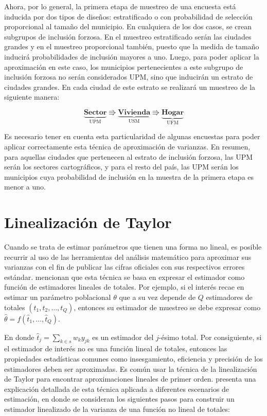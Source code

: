 \documentclass[
  12pt,
  spanish,
]{book}
\begin{document}
Ahora, por lo general, la primera etapa de muestreo de una encuesta está inducida por dos tipos de diseños: estratificado o con probabilidad de selección proporcional al tamaño del municipio. En cualquiera de los dos casos, se crean subgrupos de inclusión forzosa. En el muestreo estratificado serán las ciudades grandes y en el muestreo proporcional también, puesto que la medida de tamaño inducirá probabilidades de inclusión mayores a uno. Luego, para poder aplicar la aproximación en este caso, los municipios pertenecientes a este subgrupo de inclusión forzosa no serán considerados UPM, sino que inducirán un estrato de ciudades grandes. En cada ciudad de este estrato se realizará un muestreo de la siguiente manera:

\begin{equation*}
\underbrace{\textbf{Sector}}_{\text{UPM}} \Rrightarrow
\underbrace{\textbf{Vivienda}}_{\text{USM}} \Rrightarrow
\underbrace{\textbf{Hogar}}_{\text{UFM}}
\end{equation*}

Es necesario tener en cuenta esta particularidad de algunas encuestas para poder aplicar correctamente esta técnica de aproximación de varianzas. En resumen, para aquellas ciudades que pertenecen al estrato de inclusión forzosa, las UPM serán los sectores cartográficos, y para el resto del país, las UPM serán los municipios cuya probabilidad de inclusión en la muestra de la primera etapa es menor a uno.

\hypertarget{linealizaciuxf3n-de-taylor}{%
\section{Linealización de Taylor}\label{linealizaciuxf3n-de-taylor}}

Cuando se trata de estimar parámetros que tienen una forma no lineal, es posible recurrir al uso de las herramientas del análisis matemático para aproximar sus varianzas con el fin de publicar las cifras oficiales con sus respectivos errores estándar. \citet{Valliant_Dever_Kreuter_2013} mencionan que esta técnica se basa en expresar el estimador como función de estimadores lineales de totales. Por ejemplo, si el interés recae en estimar un parámetro poblacional \(\theta\) que a su vez depende de \(Q\) estimadores de totales \((t_1, t_2, \ldots, t_Q)\), entonces su estimador de muestreo se debe expresar como \(\hat{\theta}=f(\hat{t}_1, \ldots, \hat{t}_Q)\).

En donde \(\hat{t}_j=\sum_{k\in s}w_k y_{jk}\) es un estimador del \(j\)-ésimo total. Por consiguiente, si el estimador de interés no es una función lineal de totales, entonces las propiedades estadísticas comunes como insesgamiento, eficiencia y precisión de los estimadores deben ser aproximadas. Es común usar la técnica de la linealización de Taylor para encontrar aproximaciones lineales de primer orden. \citet[capitulo 8]{Gutierrez_2016} presenta una explicación detallada de esta técnica aplicada a diferentes escenarios de estimación, en donde se consideran los siguientes pasos para construir un estimador linealizado de la varianza de una función no lineal de totales:
\end{document}
